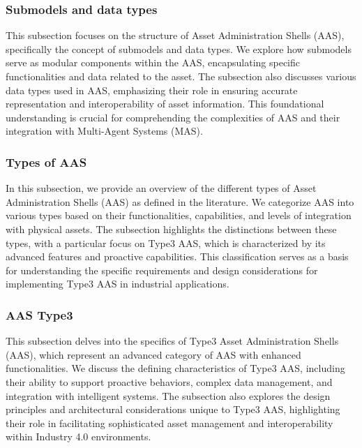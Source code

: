 \subsubsection{Submodels and data types}
\begin{tcolorbox}[colback=black!5!white,colframe=black!75!black,
  title=About Submodels and Data Types]
  This subsection focuses on the structure of Asset Administration Shells (AAS), specifically the concept of submodels and data types. We explore how submodels serve as modular components within the AAS, encapsulating specific functionalities and data related to the asset. The subsection also discusses various data types used in AAS, emphasizing their role in ensuring accurate representation and interoperability of asset information. This foundational understanding is crucial for comprehending the complexities of AAS and their integration with Multi-Agent Systems (MAS).
\end{tcolorbox}

\subsubsection{Types of AAS}
\begin{tcolorbox}[colback=black!5!white,colframe=black!75!black,
  title=About Types of AAS]
  In this subsection, we provide an overview of the different types of Asset Administration Shells (AAS) as defined in the literature. We categorize AAS into various types based on their functionalities, capabilities, and levels of integration with physical assets. The subsection highlights the distinctions between these types, with a particular focus on Type3 AAS, which is characterized by its advanced features and proactive capabilities. This classification serves as a basis for understanding the specific requirements and design considerations for implementing Type3 AAS in industrial applications.
\end{tcolorbox}
\subsubsection{AAS Type3}
\begin{tcolorbox}[colback=black!5!white,colframe=black!75!black,
  title=About AAS Type3]
  This subsection delves into the specifics of Type3 Asset Administration Shells (AAS), which represent an advanced category of AAS with enhanced functionalities. We discuss the defining characteristics of Type3 AAS, including their ability to support proactive behaviors, complex data management, and integration with intelligent systems. The subsection also explores the design principles and architectural considerations unique to Type3 AAS, highlighting their role in facilitating sophisticated asset management and interoperability within Industry 4.0 environments.
\end{tcolorbox}
